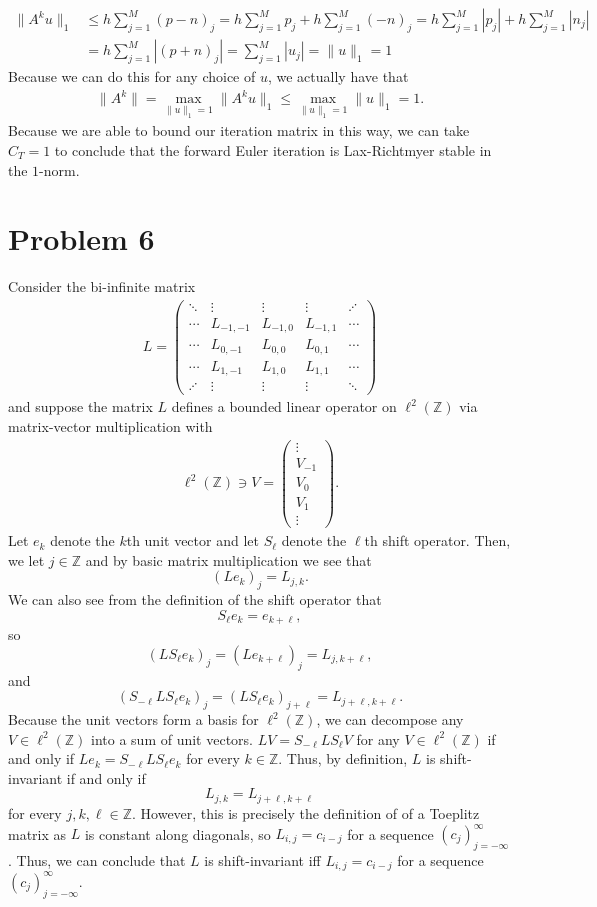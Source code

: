 \documentclass{article}
\begin{document}
\begin{align*}
\|A^ku\|_1&\leq h\sum_{j=1}^M(p-n)_j=h\sum_{j=1}^Mp_j+h\sum_{j=1}^M(-n)_j=h\sum_{j=1}^M|p_j|+h\sum_{j=1}^M|n_j|\\&=h\sum_{j=1}^M|(p+n)_j|=\sum_{j=1}^M|u_j|=\|u\|_1=1
\end{align*}
Because we can do this for any choice of $u$, we actually have that 
\begin{align*}
	\|A^k\|=\max_{\|u\|_1=1}\|A^ku\|_1\leq\max_{\|u\|_1=1}\|u\|_1=1.
\end{align*}
Because we are able to bound our iteration matrix in this way, we can take $C_T=1$ to conclude that the forward Euler iteration is Lax-Richtmyer stable in the $1$-norm.

\section{Problem 6}
Consider the bi-infinite matrix
\begin{align*}
	L = \begin{pmatrix}
		\ddots & \vdots & \vdots & \vdots  & \iddots \\
		\cdots & L_{-1,-1} & L_{-1,0} & L_{-1,1} & \cdots \\
		\cdots & L_{0,-1} & L_{0,0} & L_{0,1} & \cdots \\
		\cdots & L_{1,-1} & L_{1,0} & L_{1,1} & \cdots \\
		\iddots & \vdots & \vdots & \vdots & \ddots
	\end{pmatrix}                
\end{align*}
and suppose the matrix $L$ defines a bounded linear operator on $\ell^2(\mathbb Z)$ via matrix-vector multiplication with
\begin{align*}
	\ell^2(\mathbb Z) \ni V = \begin{pmatrix} \vdots \\ V_{-1} \\ V_0 \\ V_1 \\\vdots \end{pmatrix}.
\end{align*}
Let $e_k$ denote the $k$th unit vector and let $S_\ell$ denote the $\ell$th shift operator. Then, we let $j\in\mathbb{Z}$ and by basic matrix multiplication we see that 
\[
(Le_k)_j=L_{j,k}.
\]
We can also see from the definition of the shift operator that
\[
S_\ell e_k=e_{k+\ell},
\]
so
\[
(LS_\ell e_k)_j=(Le_{k+\ell})_j=L_{j,k+\ell},
\]
and
\[
(S_{-\ell} LS_\ell e_k)_j=(LS_\ell e_k)_{j+\ell}=L_{j+\ell,k+\ell}.
\]
Because the unit vectors form a basis for $\ell^2(\mathbb Z)$, we can decompose any $V\in\ell^2(\mathbb Z)$ into a sum of unit vectors. $LV=S_{-\ell}LS_\ell V$ for any $V\in\ell^2(\mathbb Z)$ if and only if $Le_k=S_{-\ell}LS_\ell e_k$ for every $k\in\mathbb{Z}$. Thus, by definition, $L$ is shift-invariant if and only if
\[
L_{j,k}=L_{j+\ell,k+\ell}
\]
for every $j,k,\ell\in\mathbb{Z}$. However, this is precisely the definition of of a Toeplitz matrix as $L$ is constant along diagonals, so $L_{i,j}=c_{i-j}$ for a sequence $(c_j)_{j=-\infty}^\infty$. Thus, we can conclude that $L$ is shift-invariant iff $L_{i,j}=c_{i-j}$ for a sequence $(c_j)_{j=-\infty}^\infty$.
\end{document}
